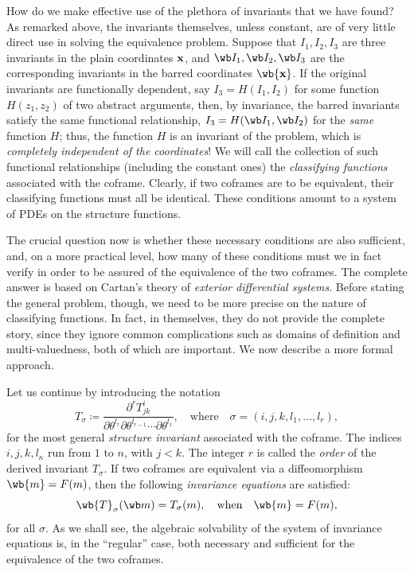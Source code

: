 \PRLsep

How do we make effective use of the plethora of invariants that we have found? As remarked above, the invariants themselves, unless constant, are of very little direct use in solving the equivalence problem. Suppose that $I_1,I_2,I_3$ are three invariants in the plain coordinates $\bf{x}$, and $\wb I_1,\wb I_2,\wb I_3$ are the corresponding invariants in the barred coordinates $\wb{\bf x}$. If the original invariants are functionally dependent, say $I_3=H(I_1,I_2)$ for some function $H(z_1,z_2)$ of two abstract arguments, then, by invariance, the barred invariants satisfy the same functional relationship, $I_3=H(\wb I_1,\wb I_2)$ for the \emph{same} function $H$; thus, the function $H$ is an invariant of the problem, which is \emph{completely independent of the coordinates}! We will call the collection of such functional relationships (including the constant ones) the \emph{classifying functions} associated with the coframe.  Clearly, if two coframes are to be equivalent, their classifying functions must all be identical. These conditions amount to a system of PDEs on the structure functions.

The crucial question now is whether these necessary conditions are also sufficient, and, on a more practical level, how many of these conditions must we in fact verify in order to be assured of the equivalence of the two coframes. The complete answer is based on Cartan's theory of \emph{exterior differential systems}. Before stating the general problem, though, we need to be more precise on the nature of classifying functions. In fact, in themselves, they do not provide the complete story, since they ignore common complications such as domains of definition and multi-valuedness, both of which are important. We now describe a more formal approach.

Let us continue by introducing the notation 
\[T_\sigma\coloneqq \frac{\partial^r T^i_{jk}}{\partial\theta^{l_r}\partial\theta^{l_{r-1}}\cdots\partial\theta^{l_1}},\quad\text{where}\quad \sigma=(i,j,k,l_1,\ldots,l_r),\]
for the most general \emph{structure invariant} associated with the coframe. The indices $i,j,k,l_\kappa$ run from $1$ to $n$, with $j<k$. The integer $r$ is called the \emph{order} of the derived invariant $T_\sigma$. If two coframes are equivalent via a diffeomorphism $\wb{m}=F(m)$, then the following \emph{invariance equations} are satisfied:
\[\wb{T}_\sigma(\wb m)=T_\sigma (m),\quad \text{when}\quad \wb{m}=F(m),\label{eq 8.23 Olver93}\]
for all $\sigma$. As we shall see, the algebraic solvability of the system of invariance equations is, in the ``regular'' case, both necessary and sufficient for the equivalence of the two coframes.

